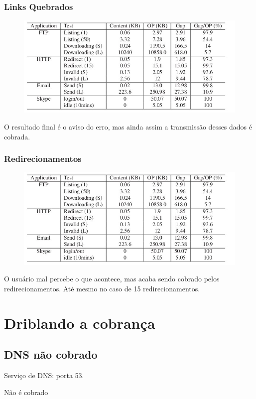 \documentclass[brazil]{beamer}
\begin{document}
\begin{frame}[fragile]
    \frametitle{Links Quebrados}
    \begin{figure}
    \begin{center}
        \includegraphics[scale=0.3]{images/applications.jpg}
    \end{center}
    \end{figure}
    O resultado final é o aviso do erro, mas ainda assim a transmissão desses dados é cobrada.

\end{frame}

\begin{frame}[fragile]
    \frametitle{Redirecionamentos}
    \begin{figure}
    \begin{center}
        \includegraphics[scale=0.3]{images/applications.jpg}
    \end{center}
    \end{figure}
    O usuário mal percebe o que acontece, mas acaba sendo cobrado pelos redirecionamentos. Até mesmo no caso de 15 redirecionamentos.
\end{frame}

\section{Driblando a cobrança}

\subsection{DNS não cobrado}
\begin{frame}[fragile]
    Serviço de DNS: porta 53.

    \vspace{0.4cm}
    \Huge{Não é cobrado}
\end{frame}
\end{document}
